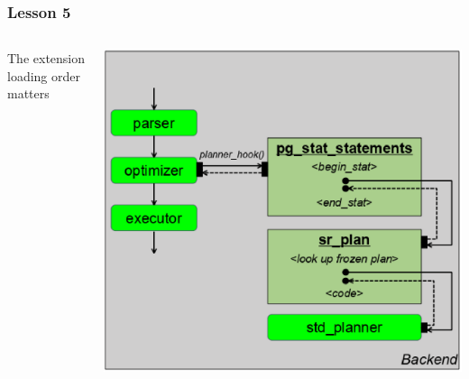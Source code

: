 \documentclass{beamer}
\begin{document}
\begin{frame}[fragile]\frametitle{Lesson 5}
\begin{columns}\begin{column}{0.4\textwidth}
The extension loading order matters
\end{column}\begin{column}{0.6\textwidth}
  \begin{center}
    \includegraphics[scale=0.41]{hook_order}
  \end{center}
\end{column}\end{columns}
\end{frame}
\end{document}
